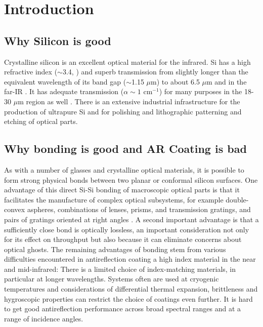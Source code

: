 \documentclass[osajnl,preprint,showpacs,superscriptaddress,12pt]{revtex4-1} %
\begin{document}
\section{Introduction}

\subsection{Why Silicon is good}
Crystalline silicon is an excellent optical material for the infrared. Si has a high refractive index ($\sim$3.4, \cite{2006SPIE.6273E..77F}) and superb transmission from slightly longer than the equivalent wavelength of its band gap ($\sim$1.15 $\mu$m) to about 6.5 $\mu$m \cite{PhysRev.108.268, PhysRev.78.178} and in the far-IR \cite{doi:10.1117/12.323764}.  It has adequate transmission  ($\alpha \sim 1$ cm$^{-1}$) for many purposes in the 18-30 $\mu$m region as well \cite{doi:10.1117/12.323764}.  There is an extensive industrial infrastructure for the production of ultrapure Si and for polishing and lithographic patterning and etching of optical parts.  

\subsection{Why bonding is good and AR Coating is bad}
As with a number of glasses and crystalline optical materials, it is possible to form strong physical bonds between two planar or conformal silicon surfaces.  One advantage of this direct Si-Si bonding of macroscopic optical parts is that it facilitates the manufacture of complex optical subsystems, for example double-convex aspheres, combinations of lenses, prisms, and transmission gratings, and pairs of gratings oriented at right angles \cite{2012SPIE.8450E..2TV, 2010SPIE.7739E.123G}.  A second important advantage is that a sufficiently close bond is optically lossless, an important consideration not only for its effect on throughput but also because it can eliminate concerns about optical ghosts.  The remaining advantages of bonding stem from various difficulties encountered in antireflection coating a high index material in the near and mid-infrared:  There is a limited choice of index-matching materials, in particular at longer wavelengths.  Systems often are used at cryogenic temperatures and considerations of differential thermal expansion, brittleness and hygroscopic properties can restrict the choice of coatings even further. It is hard to get good antireflection performance across broad spectral ranges and at a range of incidence angles. 
\end{document}
